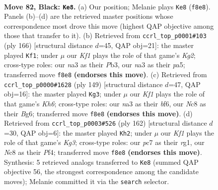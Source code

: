 \documentclass[11pt]{article}
\begin{document}
\clearpage

\begin{figure}[p]\centering
\begin{subfigure}{0.46\textwidth}\centering
\resizebox{\linewidth}{!}{%
\newchessgame
\chessboard[
  setfen={2n2k1K/2P5/p7/P4p1p/4pBb1/N1r3P1/8/R7 b - - 71 82},
  showmover=false,
  pgfstyle=straightmove, color=movearrow, markmove={f8-e8}
]}
\caption{}
\end{subfigure}\hfill
\begin{subfigure}{0.46\textwidth}\centering
\resizebox{\linewidth}{!}{%
\newchessgame
\chessboard[
  setfen={8/2b1k3/5p2/pR3B1p/P3P2P/1Pr5/6K1/8 w - - 3 84},
  showmover=false,
  pgfstyle=straightmove, color=movearrow, markmove={g2-f1}
]}
\caption{}
\end{subfigure}
\\[4pt]
\begin{subfigure}{0.46\textwidth}\centering
\resizebox{\linewidth}{!}{%
\newchessgame
\chessboard[
  setfen={8/7p/2r2Bb1/1p4P1/p7/P6k/1KP2R2/8 b - - 57 75},
  showmover=false,
  pgfstyle=straightmove, color=movearrow, markmove={h3-g3}
]}
\caption{}
\end{subfigure}\hfill
\begin{subfigure}{0.46\textwidth}\centering
\resizebox{\linewidth}{!}{%
\newchessgame
\chessboard[
  setfen={8/7p/1p3k2/1BbR1p1P/P1P2P2/6K1/8/6r1 w - - 83 82},
  showmover=false,
  pgfstyle=straightmove, color=movearrow, markmove={g3-h2}
]}
\caption{}
\end{subfigure}
\caption{\textbf{Move 82, Black: \texttt{Ke8}.} (a) Our position; Melanie plays \texttt{Ke8} (\texttt{f8e8}). Panels (b)--(d) are the retrieved master positions whose correspondence most drove this move (highest QAP objective among those that transfer to it). (b) Retrieved from \texttt{ccrl\_top\_p0001\#103} (ply 166) [structural distance $d$=45, QAP obj=21]: the master played \texttt{Kf1}; under $\mu$ our \emph{Kf1} plays the role of that game's \emph{Kg2}; cross-type roles: our \emph{n}a3 as their \emph{P}b3, our \emph{n}a3 as their \emph{p}a5; transferred move \texttt{f8e8} \textbf{(endorses this move)}. (c) Retrieved from \texttt{ccrl\_top\_p0000\#1628} (ply 149) [structural distance $d$=47, QAP obj=16]: the master played \texttt{Kg3}; under $\mu$ our \emph{Kf1} plays the role of that game's \emph{Kh6}; cross-type roles: our \emph{n}a3 as their \emph{b}f6, our \emph{N}c8 as their \emph{B}g6; transferred move \texttt{f8e8} \textbf{(endorses this move)}. (d) Retrieved from \texttt{ccrl\_top\_p0003\#526} (ply 162) [structural distance $d$=30, QAP obj=6]: the master played \texttt{Kh2}; under $\mu$ our \emph{Kf1} plays the role of that game's \emph{Kg3}; cross-type roles: our \emph{p}c7 as their \emph{r}g1, our \emph{N}c8 as their \emph{P}f4; transferred move \texttt{f8e8} \textbf{(endorses this move)}. Synthesis: 5 retrieved analogs transferred to \texttt{Ke8} (summed QAP objective 56, the strongest correspondence among the candidate moves); Melanie committed it via the \texttt{search} selector.}
\label{fig:thought-m163}
\end{figure}
\end{document}
